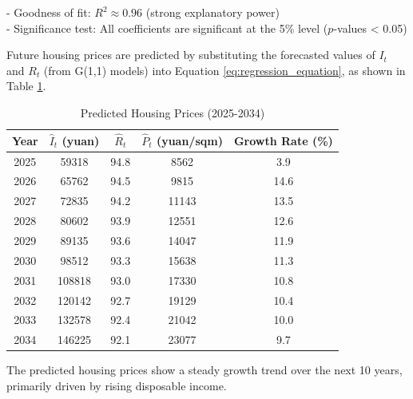\documentclass{mcmthesis}
\begin{document}
- Goodness of fit: \( R^2 \approx 0.96 \) (strong explanatory power)\\
- Significance test: All coefficients are significant at the 5\% level (\( p \)-values < 0.05)

Future housing prices are predicted by substituting the forecasted values of \( I_t \) and \( R_t \) (from G(1,1) models) into Equation \eqref{eq:regression_equation}, as shown in Table \ref{tab:housing_price_prediction}.

\begin{table}[H]
    \centering
    \renewcommand{\arraystretch}{1.2}
    \begin{tabular}{c c c c c}
        \toprule
        Year & \( \hat{I}_t \) (yuan) & \( \hat{R}_t \) & \( \hat{P}_t \) (yuan/sqm) & Growth Rate (\%) \\
        \midrule
        2025 & 59318 & 94.8 & 8562 & 3.9 \\
        2026 & 65762 & 94.5 & 9815 & 14.6 \\
        2027 & 72835 & 94.2 & 11143 & 13.5 \\
        2028 & 80602 & 93.9 & 12551 & 12.6 \\
        2029 & 89135 & 93.6 & 14047 & 11.9 \\
        2030 & 98512 & 93.3 & 15638 & 11.3 \\
        2031 & 108818 & 93.0 & 17330 & 10.8 \\
        2032 & 120142 & 92.7 & 19129 & 10.4 \\
        2033 & 132578 & 92.4 & 21042 & 10.0 \\
        2034 & 146225 & 92.1 & 23077 & 9.7 \\
        \bottomrule
    \end{tabular}
    \caption{Predicted Housing Prices (2025-2034)}
    \label{tab:housing_price_prediction}
\end{table}

The predicted housing prices show a steady growth trend over the next 10 years, primarily driven by rising disposable income.
\end{document}

